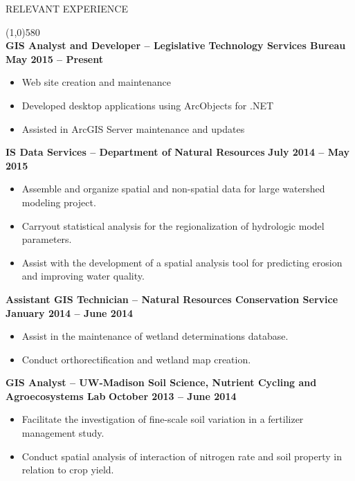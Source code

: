 \documentclass{article}
\begin{document}
\noindent \large{RELEVANT EXPERIENCE}\\ \begin{small}
\line(1,0){580}\\
	\noindent \textbf{GIS Analyst and Developer -- Legislative Technology Services Bureau} \hfill \textbf{May 2015 -- Present}
	\begin{itemize}
		\item Web site creation and maintenance
		\item Developed desktop applications using ArcObjects for .NET
		\item Assisted in ArcGIS Server maintenance and updates
	\end{itemize}
	\noindent \textbf{IS Data Services -- Department of Natural Resources} \hfill \textbf{July 2014 -- May 2015}
	\begin{itemize}
		\item Assemble and organize spatial and non-spatial data for large watershed modeling project.
		\item Carryout statistical analysis for the regionalization of hydrologic model parameters. 
		\item Assist with the development of a spatial analysis tool 
		 for predicting erosion and improving water quality.
	\end{itemize}
	\noindent \textbf{Assistant GIS Technician -- Natural Resources Conservation Service} \hfill \textbf{January 2014 -- June 2014}
	\begin{itemize}
		\item Assist in the maintenance of wetland determinations database.
		\item Conduct orthorectification and wetland map creation. 
	\end{itemize}
	\noindent \textbf{GIS Analyst -- UW-Madison Soil Science, Nutrient Cycling and Agroecosystems Lab} \hfill \textbf{October 2013 -- June 2014}
	\begin{itemize}
		\item Facilitate the investigation of fine-scale soil variation in a fertilizer management study.
		\item Conduct spatial analysis of interaction of nitrogen rate and soil property in relation to crop yield.

\end{itemize}
\end{small}
\end{document}
